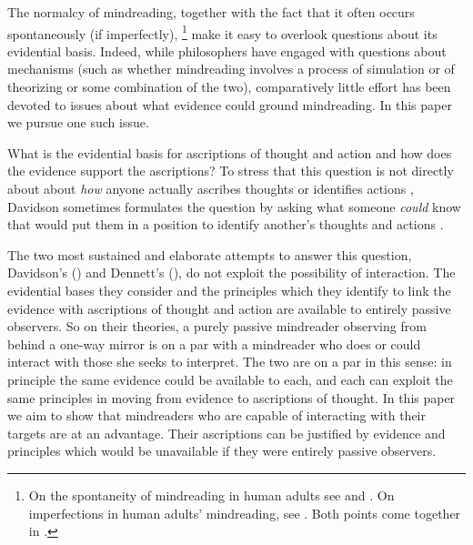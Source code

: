 \documentclass[14pt,a4paper]{extarticle}
\begin{document}
The normalcy of mindreading,
together with the fact that it often occurs spontaneously (if imperfectly),%
%
\footnote{
On the spontaneity of mindreading in human adults see 
\citet{senju_mindblind_2009} and 
\citet{ferguson_eye_2011}.
On imperfections in human adults' mindreading, 
see \citet{Keysar:2003xu}.
Both points come together in \citet{ferguson_listeners_2012}.
}
%
make it easy to 
overlook questions about its evidential basis.
Indeed,
while philosophers have engaged with questions about mechanisms (such as whether mindreading involves a process of simulation or of theorizing or some combination of the two),
comparatively little effort has been devoted to issues about what evidence could ground mindreading.
In this paper we pursue one such issue.


What is the evidential basis for ascriptions of thought and action and how does the evidence support the ascriptions?
To stress that this question is not directly about about \emph{how} anyone actually ascribes thoughts or identifies actions%
, Davidson 
sometimes formulates the question by asking what someone \emph{could} know that would put them in a position to identify another's thoughts and actions \citep[e.g.][p.\ 126]{Davidson:1973jx}.

The two most sustained and elaborate attempts to answer this question,
Davidson's (\citeyear{Davidson:1984wh}) and Dennett's (\citeyear{Dennett:1987sf}),
do not exploit the possibility of interaction.
The evidential bases they consider and the principles which they identify to link the evidence with ascriptions of thought and action are available to entirely passive observers.
So on their theories,
a purely passive mindreader observing from behind a one-way mirror
is on a par with
a mindreader who does or could interact with those she seeks to interpret.
The two are on a par in this sense:
in principle the same evidence could be available to each, and each can exploit the same principles in moving from evidence to ascriptions of thought.
In this paper we aim to show
that mindreaders who are capable of interacting with their targets are at an advantage.
Their ascriptions can be justified by evidence and principles which would be unavailable if they were entirely passive observers.
\end{document}
